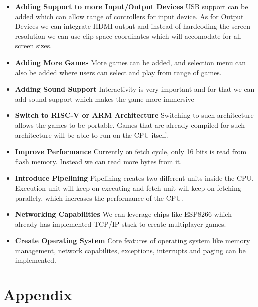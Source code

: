 \documentclass[a4paper,12pt]{article}
\begin{document}
    \begin{itemize}
        \item \textbf{Adding Support to more Input/Output Devices} USB support can be added which can allow range of controllers for input device. As for Output Devices we can integrate HDMI output and instead of hardcoding the screen resolution we can use clip space coordinates which will accomodate for all screen sizes. 
        \item \textbf{Adding More Games} More games can be added, and selection menu can also be added where users can select and play from range of games.
        \item \textbf{Adding Sound Support} Interactivity is very important and for that we can add sound support which makes the game more immersive 
        \item \textbf{Switch to RISC-V or ARM Architecture} Switching to such architecture allows the games to be portable. Games that are already compiled for such architecture will be able to run on the CPU itself.
        \item \textbf{Improve Performance} Currently on fetch cycle, only 16 bits is read from flash memory. Instead we can read more bytes from it.
        \item \textbf{Introduce Pipelining} Pipelining creates two different units inside the CPU. Execution unit will keep on executing and fetch unit will keep on fetching parallely, which increases the performance of the CPU.
        \item \textbf{Networking Capabilities} We can leverage chips like ESP8266 which already has implemented TCP/IP stack to create multiplayer games. 
        \item \textbf{Create Operating System} Core features of operating system like memory management, network capabilites, exceptions, interrupts and paging can be implemented. 
    \end{itemize}




    \section{Appendix}
\end{document}
